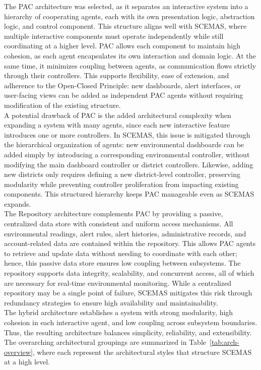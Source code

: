 \documentclass[]{article}
\begin{document}
\noindent The PAC architecture was selected, as it separates an interactive system into a hierarchy of cooperating agents, each with its own presentation logic, abstraction 
logic, and control component. This structure aligns well with SCEMAS, where multiple interactive components must operate independently while still coordinating at a higher level. PAC allows each component to maintain high cohesion, as each agent encapsulates its own interaction and domain logic. At the same time, it minimizes coupling between agents, as communication flows strictly through their controllers. This supports flexibility, ease of extension, and adherence to the Open-Closed Principle: new dashboards, alert interfaces, or user-facing views can be added as independent PAC agents without requiring modification of the existing structure. \\

\noindent A potential drawback of PAC is the added architectural complexity when expanding a system with many agents, since each new interactive feature introduces one or more controllers. In SCEMAS, this issue is mitigated through the hierarchical organization of agents: new environmental dashboards can be added simply by introducing a corresponding environmental controller, without modifying the main dashboard controller or district controllers. Likewise, adding new districts only requires defining a new district-level controller, preserving modularity while preventing controller proliferation from impacting existing components. This structured hierarchy keeps PAC manageable even as SCEMAS expands. \\

\noindent The Repository architecture complements PAC by providing a passive, centralized data store with consistent and uniform access mechanisms. All environmental readings, alert rules, alert histories, administrative records, and account-related data are contained within the repository. This allows PAC agents to retrieve and update data without needing to coordinate with each other; hence, this passive data store ensures low coupling between subsystems. The repository supports data integrity, scalability, and concurrent access, all of which are necessary for real-time environmental monitoring. While a centralized repository may be a single point of failure, SCEMAS mitigates this risk through redundancy strategies to ensure high availability and maintainability. \\

\noindent The hybrid architecture establishes a system with strong modularity, high cohesion in each interactive agent, and low coupling across subsystem boundaries. Thus, the resulting architecture balances simplicity, reliability, and extensibility. The overarching architectural groupings are summarized in Table~\ref{tab:arch-overview}, where each represent the architectural styles that structure SCEMAS at a high level.
\end{document}
